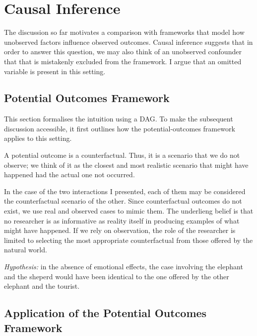 

\section{Causal Inference}

\vspace{1em}
The discussion so far motivates a comparison with frameworks that model how unobserved factors influence observed outcomes.
Causal inference \parencite{pearlCausalityModelsReasoning2009} suggests that in order to answer this question, we may also think of an unobserved confounder that that is mistakenly excluded from the framework. I argue that an omitted variable is present in this setting.

\subsection{Potential Outcomes Framework}
This section formalises the intuition using a DAG\@. To make the subsequent discussion accessible, it first outlines how the potential-outcomes framework applies to this setting.

\vspace*{1em}
A potential outcome is a counterfactual. Thus, it is a scenario that we do not observe; we think of it as the closest and most realistic scenario that might have happened had the actual one not occurred.

In the case of the two interactions I presented, each of them may be considered the counterfactual scenario of the other. Since counterfactual outcomes do not exist, we use real and observed cases to mimic them. The underlieng belief is that no researcher is as informative as reality itself in producing examples of what might have happened. If we rely on observation, the role of the researcher is limited to selecting the most appropriate counterfactual from those offered by the natural world.

\vspace*{1em}
\textit{Hypothesis:} in the absence of emotional effects, the case involving the elephant and the sheperd would have been identical to the one offered by the other elephant and the tourist.

\subsection{Application of the Potential Outcomes Framework}


